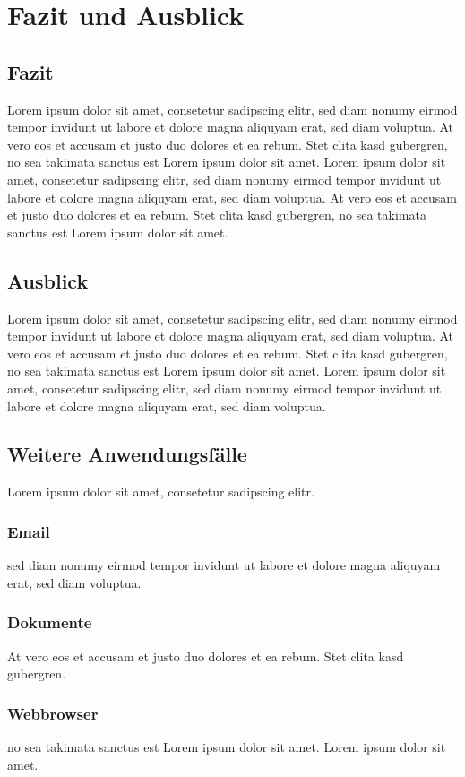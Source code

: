 \chapter{Fazit und Ausblick}

\section{Fazit}
Lorem ipsum dolor sit amet, consetetur sadipscing elitr,
sed diam nonumy eirmod tempor invidunt ut labore et dolore magna
aliquyam erat, sed diam voluptua.
At vero eos et accusam et justo duo dolores et ea rebum. Stet clita kasd gubergren,
no sea takimata sanctus est Lorem ipsum dolor sit amet. Lorem ipsum dolor sit amet,
consetetur sadipscing elitr, sed diam nonumy eirmod tempor invidunt ut labore et
dolore magna aliquyam erat, sed diam voluptua.
At vero eos et accusam et justo duo dolores et ea rebum.
Stet clita kasd gubergren, no sea takimata sanctus est Lorem ipsum dolor sit amet.

\section{Ausblick}
Lorem ipsum dolor sit amet, consetetur sadipscing elitr,
sed diam nonumy eirmod tempor invidunt ut labore et dolore magna
aliquyam erat, sed diam voluptua.
At vero eos et accusam et justo duo dolores et ea rebum. Stet clita kasd gubergren,
no sea takimata sanctus est Lorem ipsum dolor sit amet. Lorem ipsum dolor sit amet,
consetetur sadipscing elitr, sed diam nonumy eirmod tempor invidunt ut labore et
dolore magna aliquyam erat, sed diam voluptua.


\section{Weitere Anwendungsfälle}
Lorem ipsum dolor sit amet, consetetur sadipscing elitr.

\subsection{Email}
sed diam nonumy eirmod tempor invidunt ut labore et dolore magna
aliquyam erat, sed diam voluptua.

\subsection{Dokumente}
At vero eos et accusam et justo duo dolores et ea rebum. Stet clita kasd gubergren.

\subsection{Webbrowser}
no sea takimata sanctus est Lorem ipsum dolor sit amet. Lorem ipsum dolor sit amet.
